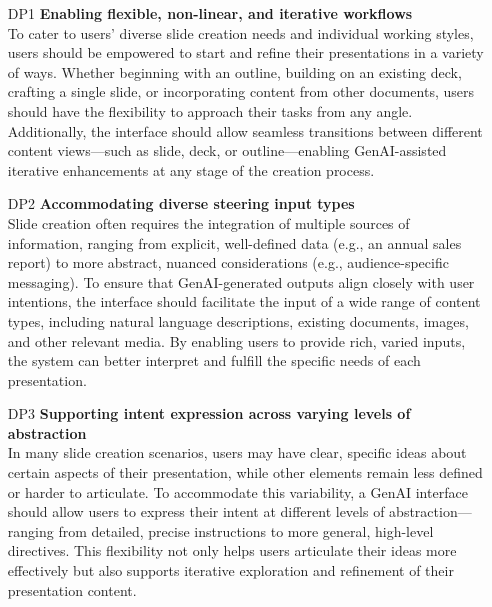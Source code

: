 \begin{itemize}[font=\bfseries,
  align=left]
    \item[DP1] \textbf{Enabling flexible, non-linear, and iterative workflows } \\
        To cater to users' diverse slide creation needs and individual working styles, users should be empowered to start and refine their presentations in a variety of ways. Whether beginning with an outline, building on an existing deck, crafting a single slide, or incorporating content from other documents, users should have the flexibility to approach their tasks from any angle. Additionally, the interface should allow seamless transitions between different content views—such as slide, deck, or outline—enabling GenAI-assisted iterative enhancements at any stage of the creation process.  
        
    \item[DP2] \textbf{Accommodating diverse steering input types} \\ 
    Slide creation often requires the integration of multiple sources of information, ranging from explicit, well-defined data (e.g., an annual sales report) to more abstract, nuanced considerations (e.g., audience-specific messaging). To ensure that GenAI-generated outputs align closely with user intentions, the interface should facilitate the input of a wide range of content types, including natural language descriptions, existing documents, images, and other relevant media. By enabling users to provide rich, varied inputs, the system can better interpret and fulfill the specific needs of each presentation.   
    
\vspace{\baselineskip} 
    
     \item[DP3] \textbf{Supporting intent expression across varying levels of abstraction} \\
    In many slide creation scenarios, users may have clear, specific ideas about certain aspects of their presentation, while other elements remain less defined or harder to articulate. To accommodate this variability, a GenAI interface should allow users to express their intent at different levels of abstraction—ranging from detailed, precise instructions to more general, high-level directives. This flexibility not only helps users articulate their ideas more effectively but also supports iterative exploration and refinement of their presentation content.     


\end{itemize}
